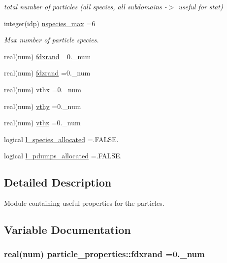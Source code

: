 \begin{DoxyCompactItemize}
\begin{DoxyCompactList}\small\item\em total number of particles (all species, all subdomains -\/$>$ useful for stat) \end{DoxyCompactList}\item 
integer(idp) \hyperlink{namespaceparticle__properties_a7f6d8f4edc23a026743320958d14d534}{nspecies\+\_\+max} =6
\begin{DoxyCompactList}\small\item\em Max number of particle species. \end{DoxyCompactList}\item 
real(num) \hyperlink{namespaceparticle__properties_a68abb05c88189b0d3f2ac02b0bde9d83}{fdxrand} =0.\+\_\+num
\item 
real(num) \hyperlink{namespaceparticle__properties_ac28362a40a4b808ff8ede4d94c4423f3}{fdzrand} =0.\+\_\+num
\item 
real(num) \hyperlink{namespaceparticle__properties_ab09cf3446a6f6d5cc0c600be909db8c1}{vthx} =0.\+\_\+num
\item 
real(num) \hyperlink{namespaceparticle__properties_a6edaa2cc58de2c03d2f9da281f25742a}{vthy} =0.\+\_\+num
\item 
real(num) \hyperlink{namespaceparticle__properties_a7826780fb51369556dcbf7bd63f1ef81}{vthz} =0.\+\_\+num
\item 
logical \hyperlink{namespaceparticle__properties_a3dcd8fa47e189305bb2534a72c4a8d5c}{l\+\_\+species\+\_\+allocated} =.F\+A\+L\+S\+E.
\item 
logical \hyperlink{namespaceparticle__properties_a5ab16464c3ac1b31175817e811763fe1}{l\+\_\+pdumps\+\_\+allocated} =.F\+A\+L\+S\+E.
\end{DoxyCompactItemize}


\subsection{Detailed Description}
Module containing useful properties for the particles. 

\subsection{Variable Documentation}
\subsubsection[{\texorpdfstring{fdxrand}{fdxrand}}]{\setlength{\rightskip}{0pt plus 5cm}real(num) particle\+\_\+properties\+::fdxrand =0.\+\_\+num}\hypertarget{namespaceparticle__properties_a68abb05c88189b0d3f2ac02b0bde9d83}{}\label{namespaceparticle__properties_a68abb05c88189b0d3f2ac02b0bde9d83}
